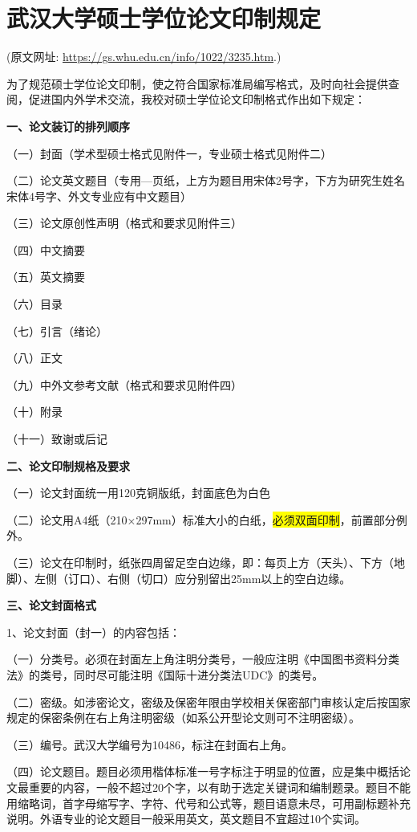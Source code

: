 \chapter{武汉大学硕士学位论文印制规定}

(原文网址: \url{https://gs.whu.edu.cn/info/1022/3235.htm}.)

为了规范硕士学位论文印制，使之符合国家标准局编写格式，及时向社会提供查阅，促进国内外学术交流，我校对硕士学位论文印制格式作出如下规定：

\textbf{一、论文装订的排列顺序}

（一）封面（学术型硕士格式见附件一，专业硕士格式见附件二）

（二）论文英文题目（专用—页纸，上方为题目用宋体2号字，下方为研究生姓名宋体4号字、外文专业应有中文题目）

（三）论文原创性声明（格式和要求见附件三）

（四）中文摘要

（五）英文摘要

（六）目录

（七）引言（绪论）

（八）正文

（九）中外文参考文献（格式和要求见附件四）

（十）附录

（十一）致谢或后记

\textbf{二、论文印制规格及要求}

（一）论文封面统一用120克铜版纸，封面底色为白色

（二）论文用A4纸（210×297mm）标准大小的白纸，\colorbox{yellow}{必须双面印制}，前置部分例外。

（三）论文在印制时，纸张四周留足空白边缘，即：每页上方（天头）、下方（地脚）、左侧（订口）、右侧（切口）应分别留出25mm以上的空白边缘。

\textbf{三、论文封面格式}

1、论文封面（封一）的内容包括：

（一）分类号。必须在封面左上角注明分类号，一般应注明《中国图书资料分类法》的类号，同时尽可能注明《国际十进分类法UDC》的类号。

（二）密级。如涉密论文，密级及保密年限由学校相关保密部门审核认定后按国家规定的保密条例在右上角注明密级（如系公开型论文则可不注明密级）。

（三）编号。武汉大学编号为10486，标注在封面右上角。

（四）论文题目。题目必须用楷体标准一号字标注于明显的位置，应是集中概括论文最重要的内容，一般不超过20个字，以有助于选定关键词和编制题录。题目不能用缩略词，首字母缩写字、字符、代号和公式等，题目语意未尽，可用副标题补充说明。外语专业的论文题目一般采用英文，英文题目不宜超过10个实词。

